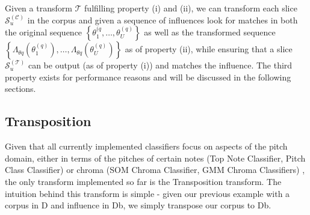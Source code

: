 \noindent Given a transform $\mathcal T$ fulfilling property (i) and (ii), we can transform each slice $\mathcal S^{(\mathcal C)}_u$ in the corpus and given a sequence of influences look for matches in both the original sequence $\left\lbrace \theta^{(q}_1, \dots, \theta^{(q)}_U\right\rbrace$ as well as the transformed sequence $\left\lbrace \Lambda_{\theta q} \left(\theta^{(q)}_1 \right), \dots, \Lambda_{\theta q} \left(\theta^{(q)}_U \right)\right\rbrace$ as of property (ii), while ensuring that a slice $\mathcal S^{(\mathcal T)}_u$ can be output (as of property (i)) and matches the influence. 
	The third property exists for performance reasons and will be discussed in the following sections.

\subsection{Transposition}\label{ssec:transposition}
Given that all currently implemented classifiers focus on aspects of the pitch domain, either in terms of the pitches of certain notes (Top Note Classifier, Pitch Class Classifier) or chroma (SOM Chroma Classifier, GMM Chroma Classifiers) \cite{borg2020dynamic}, the only transform implemented so far is the Transposition transform. The intuition behind this transform is simple - given our previous example with a corpus in D and influence in Db, we simply transpose our corpus to Db. 

